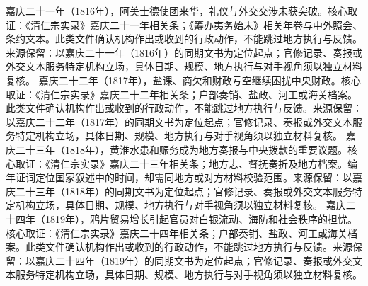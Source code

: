 嘉庆二十一年（1816年），阿美士德使团来华，礼仪与外交交涉未获突破。核心取证：《清仁宗实录》嘉庆二十一年相关条；《筹办夷务始末》相关年卷与中外照会、条约文本。此类文件确认机构作出或收到的行政动作，不能跳过地方执行与反馈。来源保留：以嘉庆二十一年（1816年）的同期文书为定位起点；官修记录、奏报或外交文本服务特定机构立场，具体日期、规模、地方执行与对手视角须以独立材料复核。
嘉庆二十二年（1817年），盐课、商欠和财政亏空继续困扰中央财政。核心取证：《清仁宗实录》嘉庆二十二年相关条；户部奏销、盐政、河工或海关档案。此类文件确认机构作出或收到的行政动作，不能跳过地方执行与反馈。来源保留：以嘉庆二十二年（1817年）的同期文书为定位起点；官修记录、奏报或外交文本服务特定机构立场，具体日期、规模、地方执行与对手视角须以独立材料复核。
嘉庆二十三年（1818年），黄淮水患和赈务成为地方奏报与中央拨款的重要议题。核心取证：《清仁宗实录》嘉庆二十三年相关条；地方志、督抚奏折及地方档案。编年证词定位国家叙述中的时间，却需同地方或对方材料校验范围。来源保留：以嘉庆二十三年（1818年）的同期文书为定位起点；官修记录、奏报或外交文本服务特定机构立场，具体日期、规模、地方执行与对手视角须以独立材料复核。
嘉庆二十四年（1819年），鸦片贸易增长引起官员对白银流动、海防和社会秩序的担忧。核心取证：《清仁宗实录》嘉庆二十四年相关条；户部奏销、盐政、河工或海关档案。此类文件确认机构作出或收到的行政动作，不能跳过地方执行与反馈。来源保留：以嘉庆二十四年（1819年）的同期文书为定位起点；官修记录、奏报或外交文本服务特定机构立场，具体日期、规模、地方执行与对手视角须以独立材料复核。

